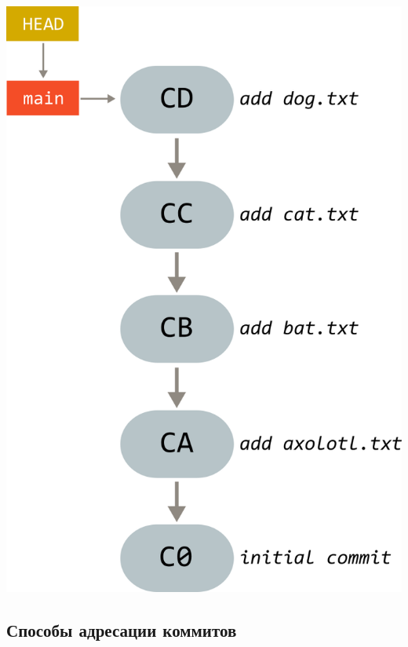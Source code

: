 \documentclass{article}
\begin{document}
\begin{minipage}{0.3\linewidth}
\begin{center}
\includegraphics[scale=0.75]{../images/animals.png}
\end{center}
\end{minipage}


\newpage
\subsection{Способы адресации коммитов}
\end{document}
